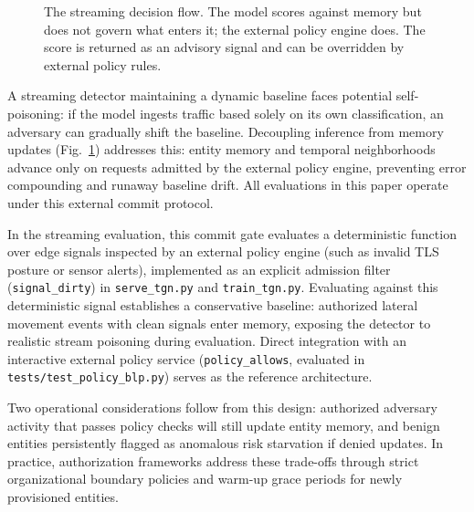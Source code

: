 \begin{figure}[ht!]
\centering
{}
\caption{The streaming decision flow. The model scores against memory but does not govern
what enters it; the external policy engine does. The score is returned as an advisory signal
and can be overridden by external policy rules.}
\label{fig:gate}
\end{figure}

A streaming detector maintaining a dynamic baseline faces potential self-poisoning: if the
model ingests traffic based solely on its own classification, an adversary can gradually
shift the baseline. Decoupling inference from memory updates (Fig.~\ref{fig:gate})
addresses this: entity memory and temporal neighborhoods advance only on requests
admitted by the external policy engine, preventing error compounding and runaway
baseline drift. All evaluations in this paper operate under this external commit protocol.

In the streaming evaluation, this commit gate evaluates a deterministic function
over edge signals inspected by an external policy engine (such as invalid TLS posture or
sensor alerts), implemented as an explicit admission filter (\texttt{signal\_dirty}) in
\texttt{serve\_tgn.py} and \texttt{train\_tgn.py}. Evaluating against this deterministic signal
establishes a conservative baseline: authorized lateral movement events with clean signals
enter memory, exposing the detector to realistic stream poisoning during evaluation.
Direct integration with an interactive external policy service (\texttt{policy\_allows},
evaluated in \texttt{tests/test\_policy\_blp.py}) serves as the reference architecture.

Two operational considerations follow from this design: authorized adversary activity that
passes policy checks will still update entity memory, and benign entities persistently flagged
as anomalous risk starvation if denied updates. In practice, authorization frameworks address
these trade-offs through strict organizational boundary policies and warm-up grace periods
for newly provisioned entities.
